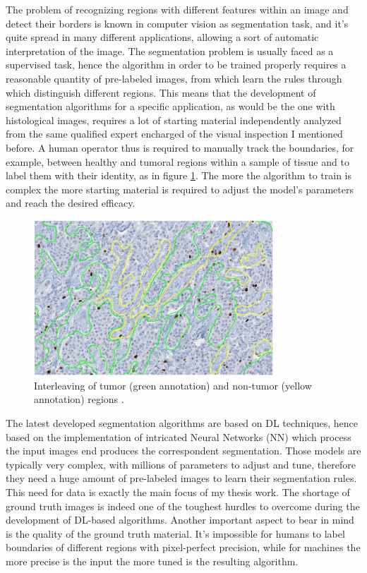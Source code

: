 The problem of recognizing regions with different features within an image and detect their borders is known in computer vision as segmentation task, and it's quite spread in many different applications, allowing a sort of automatic interpretation of the image. The segmentation problem is usually faced as a supervised task, hence the algorithm in order to be trained properly requires a reasonable quantity of pre-labeled images, from which learn the rules through which distinguish different regions. This means that the development of segmentation algorithms for a specific application, as would be the one with histological images, requires a lot of starting material independently analyzed from the same qualified expert encharged of the visual inspection I mentioned before. A human operator thus is required to manually track the boundaries, for example, between healthy and tumoral regions within a sample of tissue and to label them with their identity, as in figure \ref{fig:man_seg}. The more the algorithm to train is complex the more starting material is required to adjust the model's parameters and reach the desired efficacy.

\begin{figure}
    \centering
    \includegraphics[width = 0.8\textwidth]{images/manual_seg}
    \caption{Interleaving of tumor (green annotation) and non-tumor (yellow annotation) regions \cite{Ki67}.}
    \label{fig:man_seg}
\end{figure}


The latest developed segmentation algorithms are based on DL techniques, hence based on the implementation of intricated Neural Networks (NN) which process the input images end produces the correspondent segmentation. Those models are typically very complex, with millions of parameters to adjust and tune, therefore they need a huge amount of pre-labeled images to learn their segmentation rules. This need for data is exactly the main focus of my thesis work. The shortage of ground truth images is indeed one of the toughest hurdles to overcome during the development of DL-based algorithms. Another important aspect to bear in mind is the quality of the ground truth material. It's impossible for humans to label boundaries of different regions with pixel-perfect precision, while for machines the more precise is the input the more tuned is the resulting algorithm.


